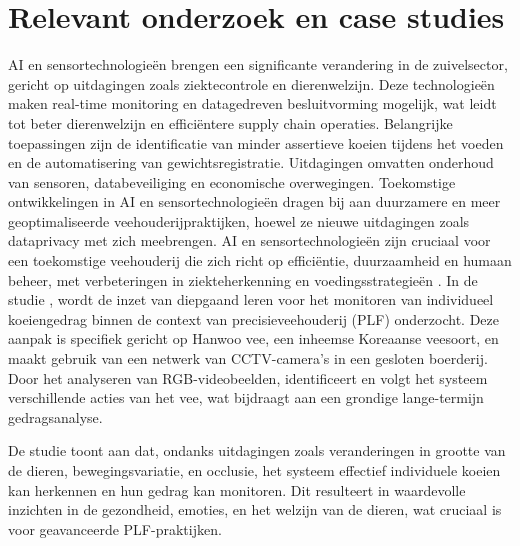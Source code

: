 \section{Relevant onderzoek en case studies}
\newline
AI en sensortechnologieën brengen een significante verandering in de zuivelsector, gericht op uitdagingen zoals ziektecontrole en dierenwelzijn. Deze technologieën maken real-time monitoring en datagedreven besluitvorming mogelijk, wat leidt tot beter dierenwelzijn en efficiëntere supply chain operaties. Belangrijke toepassingen zijn de identificatie van minder assertieve koeien tijdens het voeden en de automatisering van gewichtsregistratie. Uitdagingen omvatten onderhoud van sensoren, databeveiliging en economische overwegingen. Toekomstige ontwikkelingen in AI en sensortechnologieën dragen bij aan duurzamere en meer geoptimaliseerde veehouderijpraktijken, hoewel ze nieuwe uitdagingen zoals dataprivacy met zich meebrengen. 
AI en sensortechnologieën zijn cruciaal voor een toekomstige veehouderij die zich richt op efficiëntie, duurzaamheid en humaan beheer, met verbeteringen in ziekteherkenning en voedingsstrategieën \autocite{MDPIAIandSensors}.
\newline
In de studie \textcite{Fuentes2023}, wordt de inzet van diepgaand leren voor het monitoren van individueel koeiengedrag binnen de context van precisieveehouderij (PLF) onderzocht. Deze aanpak is specifiek gericht op Hanwoo vee, een inheemse Koreaanse veesoort, en maakt gebruik van een netwerk van CCTV-camera's in een gesloten boerderij. Door het analyseren van RGB-videobeelden, identificeert en volgt het systeem verschillende acties van het vee, wat bijdraagt aan een grondige lange-termijn gedragsanalyse.

De studie toont aan dat, ondanks uitdagingen zoals veranderingen in grootte van de dieren, bewegingsvariatie, en occlusie, het systeem effectief individuele koeien kan herkennen en hun gedrag kan monitoren. Dit resulteert in waardevolle inzichten in de gezondheid, emoties, en het welzijn van de dieren, wat cruciaal is voor geavanceerde PLF-praktijken.

